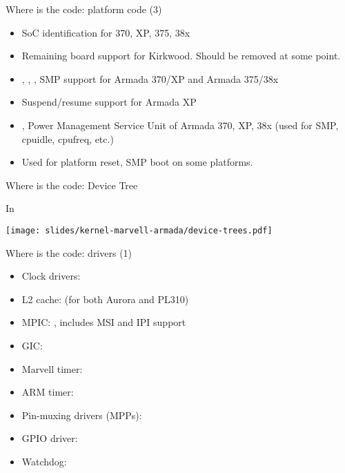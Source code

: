 \begin{frame}{Where is the code: platform code (3)}

\begin{itemize}
\item {} SoC identification for 370, XP, 375, 38x
\item {} Remaining board support for Kirkwood. Should be
  removed at some point.
\item {}, , ,
   SMP support for Armada 370/XP and Armada 375/38x
\item {} Suspend/resume support for Armada XP
\item {},  Power Management Service Unit of Armada
  370, XP, 38x (used for SMP, cpuidle, cpufreq, etc.)
\item {} Used for platform reset, SMP boot on
  some platforms.
\end{itemize}

\end{frame}

\begin{frame}{Where is the code: Device Tree}

In 

\begin{center}
  \texttt{[image: slides/kernel-marvell-armada/device-trees.pdf]}
\end{center}

\end{frame}

\begin{frame}{Where is the code: drivers (1)}

\begin{itemize}
\item Clock drivers: 
\item L2 cache:  (for both Aurora and PL310)
\item MPIC: , includes MSI
  and IPI support
\item GIC: 
\item Marvell timer: 
\item ARM timer: 
\item Pin-muxing drivers (MPPs): 
\item GPIO driver: 
\item Watchdog: 
\end{itemize}

\end{frame}


